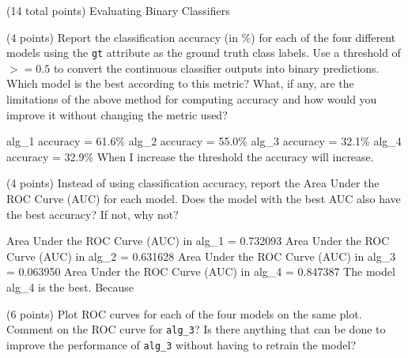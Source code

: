 \documentclass[12pt]{article}
\begin{document}
\begin{question}{(14 total points) Evaluating Binary Classifiers}





%
%
\begin{subquestion}{(4 points) Report the classification accuracy (in \%) for each of the four different models using the \texttt{gt} attribute as the ground truth class labels. 
Use a threshold of $>= 0.5$ to convert the continuous classifier outputs into binary predictions. 
Which model is the best according to this metric?
What, if any, are the limitations of the above method for computing accuracy and how would you improve it without changing the metric used?
}


\begin{answerbox}{15em}
alg_1 accuracy = 61.6\% 
alg_2 accuracy = 55.0\%
alg_3 accuracy = 32.1\%
alg_4 accuracy = 32.9\%
When I increase the threshold the accuracy will increase.
\end{answerbox}



\end{subquestion}



%
%
\begin{subquestion}{(4 points) Instead of using classification accuracy, report the Area Under the ROC Curve (AUC) for each model. 
Does the model with the best AUC also have the best accuracy? If not, why not?\\
}


\begin{answerbox}{15em}
Area Under the ROC Curve (AUC) in alg_1 = 0.732093
Area Under the ROC Curve (AUC) in alg_2 = 0.631628
Area Under the ROC Curve (AUC) in alg_3 = 0.063950
Area Under the ROC Curve (AUC) in alg_4 = 0.847387
The model alg_4 is the best. Because 



\end{answerbox}



\end{subquestion}



%
%
\begin{subquestion}{(6 points) Plot ROC curves for each of the four models on the same plot.
Comment on the ROC curve for \texttt{alg\_3}?
Is there anything that can be done to improve the performance of \texttt{alg\_3} without having to retrain the model?\\
}



\end{subquestion}
\end{question}
\end{document}
